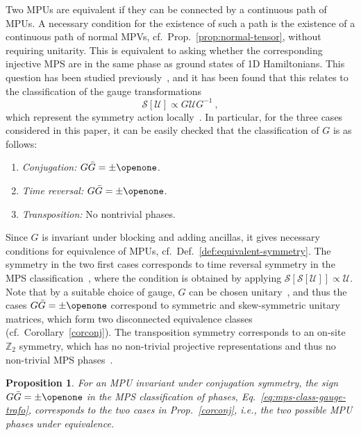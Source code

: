 \documentclass[pra,twocolumn,nofootinbib,superscriptaddress]{revtex4-1}
\newtheorem{prop}[thm]{Proposition}
\begin{document}
Two MPUs are equivalent if they can be connected by a continuous path of
MPUs. A necessary condition for the existence of such a path is the
existence of a continuous path of normal MPVs,
cf.~Prop.~\ref{prop:normal-tensor}, without requiring unitarity. This is
equivalent to asking whether the corresponding injective MPS are in the
same phase as ground states of 1D Hamiltonians. This question has been
studied
previously~\cite{pollmann:1d-sym-protection-prb,chen:1d-phases-rg,schuch:mps-phases},
and it has been found that this relates to the classification of the gauge
transformations
\begin{equation}
	\label{eq:mps-class-gauge-trafo}
	\mathcal S[\mathcal U] \propto G \mathcal U G^{-1}\ ,
\end{equation}
which represent the symmetry action
locally~\cite{pollmann:1d-sym-protection-prb,chen:1d-phases-rg,schuch:mps-phases}.
In particular, for the three cases considered in this paper, it can be
easily checked that the classification of $G$ is as follows:
\begin{enumerate}
	\item \emph{Conjugation:} $G\bar{G}=\pm \openone$.
	\item \emph{Time reversal:} $G\bar{G}=\pm \openone$.
	\item \emph{Transposition:} No nontrivial phases.
\end{enumerate}
Since $G$ is invariant under blocking and adding ancillas, it gives
necessary conditions for equivalence of MPUs,
cf.~Def.~\ref{def:equivalent-symmetry}. The symmetry
in the two first cases corresponds to time reversal symmetry in the MPS
classification~\cite{pollmann:1d-sym-protection-prb}, where the
condition is obtained by applying $\mathcal S[\mathcal S[\mathcal
					U]]\propto \mathcal U$.  Note
that by a suitable choice of gauge, $G$ can be chosen
unitary~\cite{cirac:mpdo-rgfp},
and thus the cases $G\bar{G}=\pm\openone$ correspond to symmetric and
skew-symmetric unitary matrices, which form two disconnected equivalence
classes
(cf.~Corollary~\ref{corconj}).  The transposition symmetry corresponds to
an on-site $\mathbb Z_2$ symmetry, which has no non-trivial projective
representations and thus no non-trivial MPS
phases~\cite{chen:1d-phases-rg,schuch:mps-phases}.

\begin{prop}
	\label{prop:mps-class-eq-mpu-class-for-conjugation}
	For an MPU invariant under conjugation symmetry, the sign $G\bar
		G=\pm\openone$ in the MPS classification of phases,
	Eq.~\eqref{eq:mps-class-gauge-trafo}, corresponds to the two cases in
	Prop.~\ref{corconj}, i.e., the two possible MPU phases under equivalence.
\end{prop}
\end{document}
